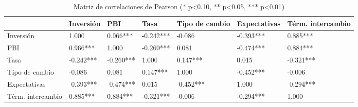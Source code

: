 \begin{table}
\caption{Matriz de correlaciones de Pearson (* p<0.10, ** p<0.05, *** p<0.01)}
\label{tab:tabla3_correlaciones}
\begin{tabular}{lllllll}
\toprule
 & Inversión & PBI & Tasa & Tipo de cambio & Expectativas & Térm. intercambio \\
\midrule
Inversión & 1.000 & 0.966*** & -0.242*** & -0.086 & -0.393*** & 0.885*** \\
PBI & 0.966*** & 1.000 & -0.260*** & 0.081 & -0.474*** & 0.884*** \\
Tasa & -0.242*** & -0.260*** & 1.000 & 0.147*** & 0.015 & -0.321*** \\
Tipo de cambio & -0.086 & 0.081 & 0.147*** & 1.000 & -0.452*** & -0.006 \\
Expectativas & -0.393*** & -0.474*** & 0.015 & -0.452*** & 1.000 & -0.294*** \\
Térm. intercambio & 0.885*** & 0.884*** & -0.321*** & -0.006 & -0.294*** & 1.000 \\
\bottomrule
\end{tabular}
\end{table}
